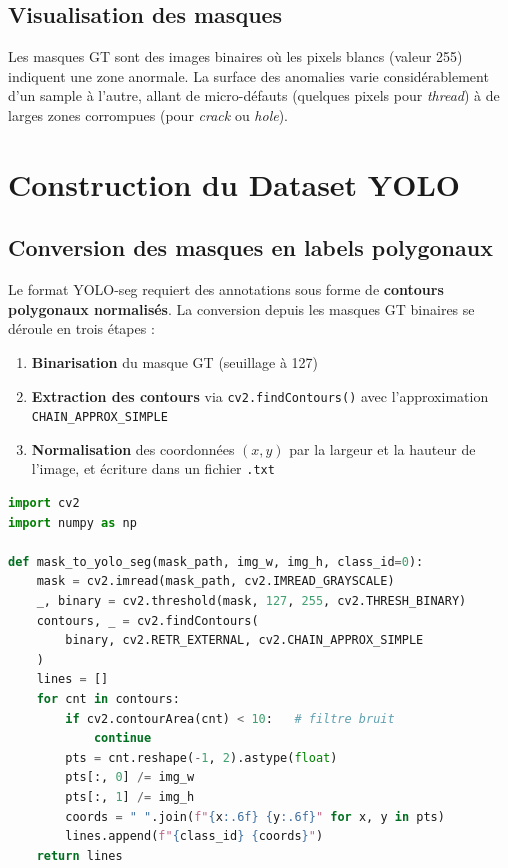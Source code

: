 \documentclass[12pt, a4paper]{report}
\begin{document}
\subsection{Visualisation des masques}

Les masques GT sont des images binaires où les pixels blancs (valeur 255) indiquent une zone anormale. La surface des anomalies varie considérablement d'un sample à l'autre, allant de micro-défauts (quelques pixels pour \textit{thread}) à de larges zones corrompues (pour \textit{crack} ou \textit{hole}).

\section{Construction du Dataset YOLO}

\subsection{Conversion des masques en labels polygonaux}

Le format YOLO-seg requiert des annotations sous forme de \textbf{contours polygonaux normalisés}. La conversion depuis les masques GT binaires se déroule en trois étapes :

\begin{enumerate}
  \item \textbf{Binarisation} du masque GT (seuillage à 127)
  \item \textbf{Extraction des contours} via \texttt{cv2.findContours()} avec l'approximation \texttt{CHAIN\_APPROX\_SIMPLE}
  \item \textbf{Normalisation} des coordonnées $(x, y)$ par la largeur et la hauteur de l'image, et écriture dans un fichier \texttt{.txt}
\end{enumerate}

\begin{lstlisting}[language=Python, caption=Conversion masque GT vers label YOLO-seg]
import cv2
import numpy as np

def mask_to_yolo_seg(mask_path, img_w, img_h, class_id=0):
    mask = cv2.imread(mask_path, cv2.IMREAD_GRAYSCALE)
    _, binary = cv2.threshold(mask, 127, 255, cv2.THRESH_BINARY)
    contours, _ = cv2.findContours(
        binary, cv2.RETR_EXTERNAL, cv2.CHAIN_APPROX_SIMPLE
    )
    lines = []
    for cnt in contours:
        if cv2.contourArea(cnt) < 10:   # filtre bruit
            continue
        pts = cnt.reshape(-1, 2).astype(float)
        pts[:, 0] /= img_w
        pts[:, 1] /= img_h
        coords = " ".join(f"{x:.6f} {y:.6f}" for x, y in pts)
        lines.append(f"{class_id} {coords}")
    return lines
\end{lstlisting}
\end{document}
